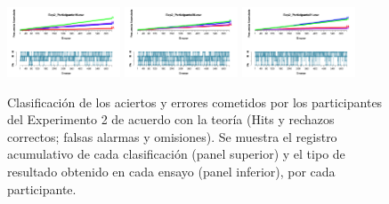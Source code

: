 \begin{figure}[th]
\includegraphics[width=0.30\textwidth]{Figures/Outcome_Exp2_P19} \includegraphics[width=0.30\textwidth]{Figures/Outcome_Exp2_P20} \includegraphics[width=0.30\textwidth]{Figures/Outcome_Exp2_P21} 
\caption[Resultados obtenidos por ensayo; Experimento 2]{Clasificación de los aciertos y errores cometidos por los participantes del Experimento 2 de acuerdo con la teoría (Hits y rechazos correctos; falsas alarmas y omisiones). Se muestra el registro acumulativo de cada clasificación (panel superior) y el tipo de resultado obtenido en cada ensayo (panel inferior), por cada participante.}
\label{fig:Outcome_E2}
\end{figure}











